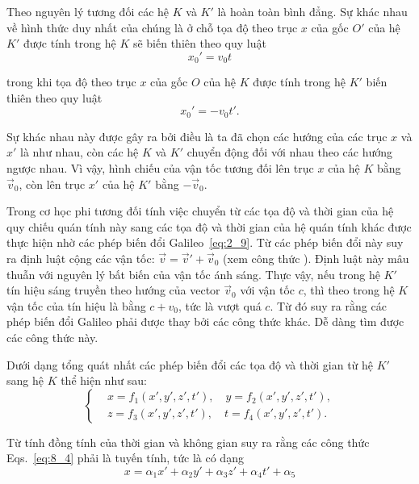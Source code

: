 Theo nguyên lý tương đối các hệ $K$ và $K'$ là hoàn toàn bình đẳng. Sự khác nhau về hình thức duy nhất của chúng là ở chỗ tọa độ theo trục $x$ của gốc $O'$ của hệ $K'$ được tính trong hệ $K$ sẽ biến thiên theo quy luật
\begin{equation}\label{eq:8_2}
	x_{0}' = v_0 t
\end{equation}

\noindent
trong khi tọa độ theo trục $x$ của gốc $O$ của hệ $K$ được tính trong hệ $K'$ biến thiên theo quy luật
\begin{equation}\label{eq:8_3}
	x_0' = - v_0 t'.
\end{equation}

\noindent
Sự khác nhau này được gây ra bởi điều là ta đã chọn các hướng của các trục $x$ và $x'$ là như nhau, còn các hệ $K$ và $K'$ chuyển động đối với nhau theo các hướng ngược nhau. Vì vậy, hình chiếu của vận tốc tương đối lên trục $x$ của hệ $K$ bằng $\vec{v}_0$, còn lên trục $x'$ của hệ $K'$ bằng $-\vec{v}_0$.

Trong cơ học phi tương đối tính việc chuyển từ các tọa độ và thời gian của hệ quy chiếu quán tính này sang các tọa độ và thời gian của hệ quán tính khác được thực hiện nhờ các phép biến đổi Galileo~\eqref{eq:2_9}. Từ các phép biến đổi này suy ra định luật cộng các vận tốc: $\vec{v}=\vec{v}'+\vec{v}_0$ (xem công thức ). Định luật này mâu thuẫn với nguyên lý bất biến của vận tốc ánh sáng. Thực vậy, nếu trong hệ $K'$ tín hiệu sáng truyền theo hướng của vector $\vec{v}_0$ với vận tốc $c$, thì theo  trong hệ $K$ vận tốc của tín hiệu là bằng $c+v_0$, tức là vượt quá $c$. Từ đó suy ra rằng các phép biến đổi Galileo phải được thay bởi các công thức khác. Dễ dàng tìm được các công thức này.

Dưới dạng tổng quát nhất các phép biến đổi các tọa độ và thời gian từ hệ $K'$ sang hệ $K$ thể hiện như sau:
\begin{equation}\label{eq:8_4}
	\begin{cases}
		&\!\!\!\! x = f_1(x',y',z',t'),\quad y = f_2(x',y',z',t'),\\
		&\!\!\!\! z = f_3(x',y',z',t'),\quad t = f_4(x',y',z',t').
	\end{cases}
\end{equation}

\noindent
Từ tính đồng tính của thời gian và không gian suy ra rằng các công thức Eqs.~\eqref{eq:8_4} phải là tuyến tính, tức là có dạng
\begin{equation}\label{eq:8_5}
	x = \alpha_1 x' + \alpha_2 y' + \alpha_3 z' + \alpha_4 t' + \alpha_5
\end{equation}

